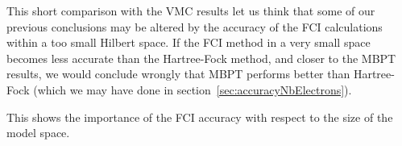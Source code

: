 This short comparison with the VMC results let us think that some of our previous conclusions may be altered by the accuracy of the FCI calculations within a too small Hilbert space. If the FCI method in a very small space becomes less accurate than the Hartree-Fock method, and closer to the MBPT results, we would conclude wrongly that MBPT performs better than Hartree-Fock (which we may have done in section~\ref{sec:accuracyNbElectrons}).

This shows the importance of the FCI accuracy with respect to the size of the model space.

